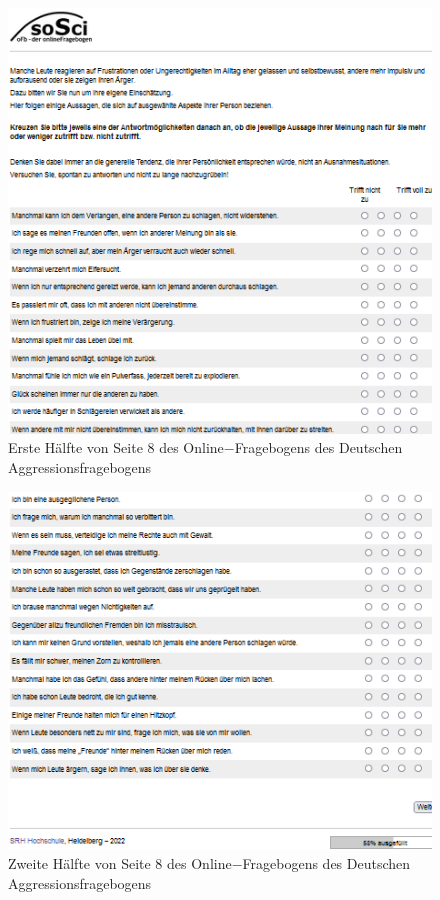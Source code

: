 \begin{appendices}
    \newpage
    \begin{figure}[htb!]
        \centering
            \includegraphics[width=\textwidth]{Seite 8_1.png}
            \caption[]{Erste Hälfte von Seite 8 des Online$-$Fragebogens des Deutschen Aggressionsfragebogens \parencite{Aggressionsfragebogen}}
    \end{figure}
    
    \newpage
    \begin{figure}[htb!]
        \centering
            \includegraphics[width=\textwidth]{Seite 8_2.png}
            \caption[]{Zweite Hälfte von Seite 8 des Online$-$Fragebogens des Deutschen Aggressionsfragebogens \parencite{Aggressionsfragebogen}}
    \end{figure}
    

\end{appendices}
